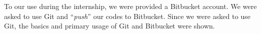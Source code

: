 To our use during the internship, we were provided a Bitbucket account. We were asked to use Git and ``\textit{push}'' our codes to Bitbucket. Since we were asked to use Git, the basics and primary usage of Git and Bitbucket were shown. 








